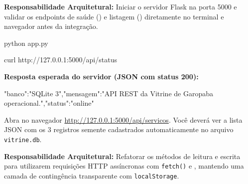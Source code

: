 \begin{boxAtividade}
\textbf{Responsabilidade Arquitetural:} Iniciar o servidor Flask na porta 5000 e validar os endpoints de saúde () e listagem () diretamente no terminal e navegador antes da integração.
\end{boxAtividade}

\begin{saida}[Terminal]
python app.py
\end{saida}

\begin{saida}[Terminal]
curl http://127.0.0.1:5000/api/status
\end{saida}

\textbf{Resposta esperada do servidor (JSON com status 200):}
\begin{saida}
{"banco":"SQLite 3","mensagem":"API REST da Vitrine de Garopaba operacional.","status":"online"}
\end{saida}

\begin{boxTeste}
Abra no navegador \url{http://127.0.0.1:5000/api/servicos}. Você deverá ver a lista JSON com os 3 registros semente cadastrados automaticamente no arquivo \texttt{vitrine.db}.
\end{boxTeste}

\begin{boxAtividade}
\textbf{Responsabilidade Arquitetural:} Refatorar os métodos de leitura e escrita para utilizarem requisições HTTP assíncronas com \texttt{fetch()} e , mantendo uma camada de contingência transparente com \texttt{localStorage}.
\end{boxAtividade}

